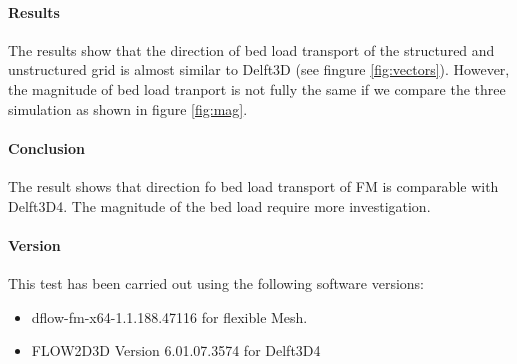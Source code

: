 \paragraph*{Results}

The results show that the direction of bed load transport of the structured and unstructured grid is almost similar to Delft3D (see fingure \ref{fig:vectors}). However, the magnitude of bed load tranport is not fully the same if we compare the three simulation as shown in figure \ref{fig:mag}.

\paragraph*{Conclusion}
The result shows that direction fo bed load transport of FM is comparable with Delft3D4. The magnitude of the bed load  require more investigation.
\paragraph*{Version}
This test has been carried out using the following software versions:
\begin{itemize}
	
	\item[$\bullet$] dflow-fm-x64-1.1.188.47116 for flexible Mesh. 
	\item[$\bullet$] FLOW2D3D Version 6.01.07.3574 for Delft3D4
	
\end{itemize}


